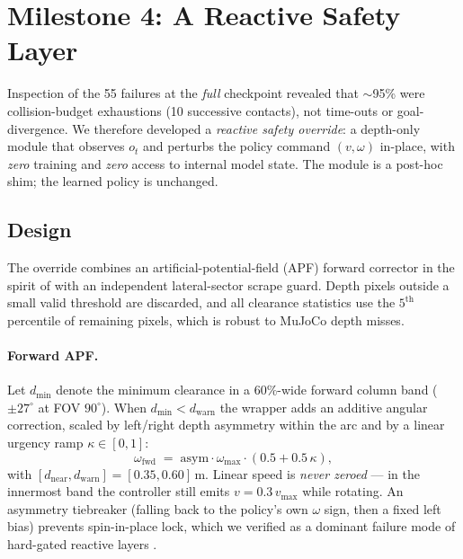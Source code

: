 \documentclass[11pt,a4paper]{article}
\begin{document}
\section{Milestone 4: A Reactive Safety Layer}\label{sec:safety}

Inspection of the 55 failures at the \emph{full} checkpoint revealed
that ${\sim}$95\% were collision-budget exhaustions (10 successive
contacts), not time-outs or goal-divergence. We therefore developed a
\emph{reactive safety override}: a depth-only module that observes
$o_t$ and perturbs the policy command $(v,\omega)$ in-place, with
\emph{zero} training and \emph{zero} access to internal model state.
The module is a post-hoc shim; the learned policy is unchanged.

\subsection{Design}

The override combines an artificial-potential-field (APF) forward
corrector in the spirit of \citet{Khatib1986} with an independent
lateral-sector scrape guard. Depth pixels outside a small valid
threshold are discarded, and all clearance statistics use the
$5^{\text{th}}$ percentile of remaining pixels, which is robust to
MuJoCo depth misses.

\paragraph{Forward APF.} Let $d_{\min}$ denote the minimum clearance
in a $60\%$-wide forward column band ($\pm 27^\circ$ at FOV $90^\circ$).
When $d_{\min}<d_{\text{warn}}$ the wrapper adds an additive angular
correction, scaled by left/right depth asymmetry within the arc and by
a linear urgency ramp $\kappa\in[0,1]$:
\begin{equation}
\omega_{\text{fwd}} \;=\; \mathrm{asym}\cdot\omega_{\max}\cdot(0.5+0.5\,\kappa),
\label{eq:fwd}
\end{equation}
with $[d_{\text{near}},d_{\text{warn}}]=[0.35,0.60]\,$m. Linear speed
is \emph{never zeroed} --- in the innermost band the controller still
emits $v=0.3\,v_{\max}$ while rotating. An asymmetry tiebreaker
(falling back to the policy's own $\omega$ sign, then a fixed left
bias) prevents spin-in-place lock, which we verified as a dominant
failure mode of hard-gated reactive layers
\citep{BorensteinKoren1989,SimmonsCVM1996}.
\end{document}
